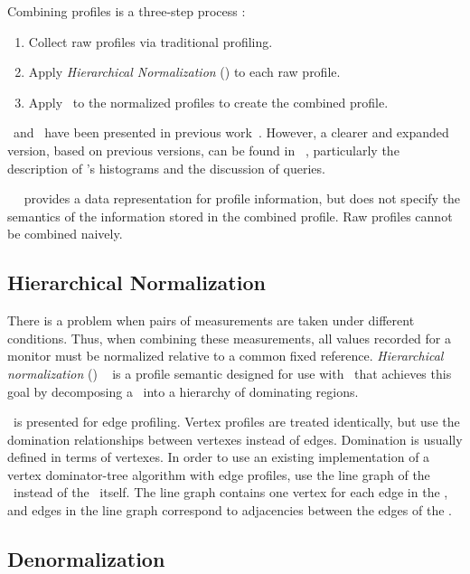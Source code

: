Combining profiles is a three-step process \cite{BerubeISPASS12}:
\begin{enumerate}
\item Collect raw profiles via traditional profiling.
\item Apply {\em Hierarchical Normalization} (\HN) to each raw profile. 
\item Apply \CP\ to the normalized profiles to create the combined profile.
\end{enumerate}

\CP\ and \HN\ have been presented in previous 
work~\cite{BerubeICPE11,BerubeISPASS12}. 
However, a clearer and expanded version, based on previous versions, can
be found in ~\cite{BerubePhD}, particularly the
description of \CP's histograms and the discussion of queries.

\CP\ ~\cite{BerubePhD} provides a data representation for profile information, but does
not specify the semantics of the information stored in the combined
profile.  Raw profiles cannot be combined naively. 

\subsection{Hierarchical Normalization}
\label{cp:hn}

There is a problem when pairs of measurements are taken under different
conditions.  Thus, when
combining these measurements, all values recorded for a monitor must
be normalized relative to a common fixed reference.  {\em Hierarchical
  normalization} (\HN) ~\cite{BerubePhD} is a profile semantic designed for use with
\CP\ that achieves this goal by decomposing a \CFG\ into a hierarchy
of dominating regions.

\HN\ is presented for edge profiling.  Vertex profiles are treated
identically, but use the domination relationships between vertexes
instead of edges.  Domination is usually defined in terms of vertexes.
In order to use an existing implementation of a vertex dominator-tree
algorithm with edge profiles, use the line graph of the \CFG\ instead of
the \CFG\ itself.  The line graph contains one vertex for each edge in
the \CFG, and edges in the line graph correspond to adjacencies
between the edges of the \CFG.

\subsection{Denormalization}
\label{cp:denorm}

